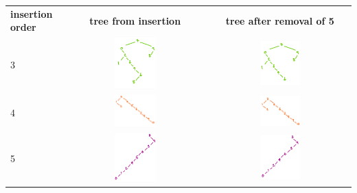 \documentclass[twoside=false,DIV=14]{scrartcl}
\begin{document}
\begin{tabular}[t]{lcc}
  \textbf{insertion order} &  \textbf{tree from insertion} & \textbf{tree after removal of 5} \\
3 & \includegraphics[width=0.3\textwidth]{3_3.jpeg} & \includegraphics[width=0.3\textwidth]{3_3_removed.jpeg} \\
4 & \includegraphics[width=0.3\textwidth]{3_4.jpeg} & \includegraphics[width=0.3\textwidth]{3_4_removed.jpeg} \\
5 & \includegraphics[width=0.3\textwidth]{3_5.jpeg} & \includegraphics[width=0.3\textwidth]{3_5_removed.jpeg} \\
\end{tabular}
\end{document}
